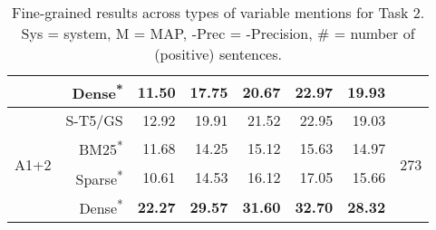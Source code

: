 \documentclass[11pt]{article}
\begin{document}
\begin{table*}[]
\begin{tabular}{l|r|r|r|r|r|r|c}
        &    Dense\textsuperscript{*} &  \textbf{11.50} &  \textbf{17.75} &   \textbf{20.67} &   \textbf{22.97} &        \textbf{19.93} &        \\
    \hline
    \hline
       \multirow{4}{4em}{A1+2} &    S-T5/GS &  12.92 &  19.91 &   21.52 &   22.95 &        19.03 &      \multirow{4}{2em}{273} \\
        &    BM25\textsuperscript{*} &  11.68 &  14.25 &   15.12 &   15.63 &        14.97 &       \\
        &    Sparse\textsuperscript{*} &  10.61 &  14.53 &   16.12 &   17.05 &        15.66 &       \\
        &    Dense\textsuperscript{*} &  \textbf{22.27} &  \textbf{29.57} &   \textbf{31.60} &   \textbf{32.70} &        \textbf{28.32} &       \\
    \hline
    \end{tabular}
    \caption{Fine-grained results across types of variable mentions for Task 2. Sys = system, M = MAP, -Prec = -Precision, \# = number of (positive) sentences.}
    \label{tab:T2-Ann12}
\end{table*}
\end{document}

